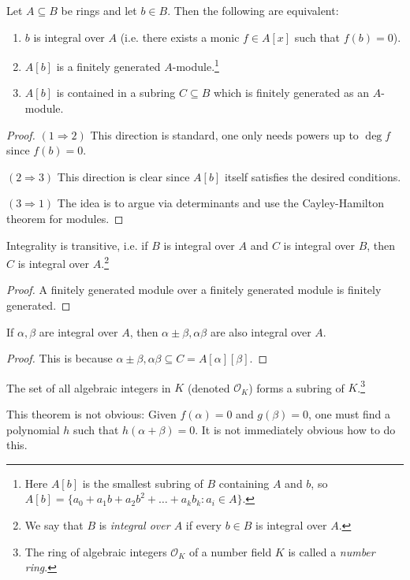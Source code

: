 \begin{theorem}
  Let $A \subseteq B$ be rings and let $b \in B$.
  Then the following are equivalent:
  \begin{enumerate}
    \item $b$ is integral over $A$ (i.e. there exists
      a monic $f \in A[x]$ such that $f(b) = 0$).
    \item $A[b]$ is a finitely generated $A$-module.\footnote{Here $A[b]$ is the smallest subring of $B$ containing $A$ and $b$, so $A[b] = \{a_0 + a_1 b + a_2 b^2 + \dots + a_k b_k : a_i \in A\}$.}
    \item $A[b]$ is contained in a subring $C \subseteq B$
      which is finitely generated as an $A$-module.
  \end{enumerate}
\end{theorem}

\begin{proof}
  $(1 \Rightarrow 2)$ This direction is standard, one
  only needs powers up to $\deg f$ since $f(b) = 0$.

  $(2 \Rightarrow 3)$ This direction is clear
  since $A[b]$ itself satisfies the desired conditions.

  $(3 \Rightarrow 1)$ The idea is to argue via
  determinants and use the Cayley-Hamilton theorem for
  modules.
\end{proof}

\begin{corollary}
  Integrality is transitive, i.e. if $B$ is integral
  over $A$ and $C$ is integral over $B$, then $C$ is
  integral over $A$.\footnote{We say that $B$ is \emph{integral over $A$} if every $b \in B$ is integral over $A$.}
\end{corollary}

\begin{proof}
  A finitely generated module over a finitely
  generated module is finitely generated.
\end{proof}

\begin{corollary}
  If $\alpha, \beta$ are integral over $A$, then
  $\alpha \pm \beta, \alpha \beta$ are also integral
  over $A$.
\end{corollary}

\begin{proof}
  This is because
  $\alpha \pm \beta, \alpha \beta \subseteq C = A[\alpha][\beta]$.
\end{proof}

\begin{theorem}
  The set of all algebraic integers in $K$ (denoted
  $\mathcal{O}_K$) forms a
  subring of $K$.\footnote{The ring of algebraic integers $\mathcal{O}_K$ of a number field $K$ is called a \emph{number ring}.}
\end{theorem}

\begin{remark}
  This theorem is not obvious: Given $f(\alpha) = 0$ and
  $g(\beta) = 0$, one must find a polynomial $h$ such
  that $h(\alpha + \beta) = 0$. It is not immediately
  obvious how to do this.
\end{remark}

